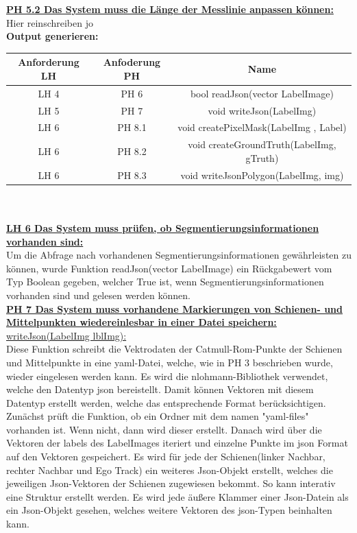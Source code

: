 \documentclass[11pt]{scrartcl}
\begin{document}
\noindent
\underline{\textbf {PH 5.2 Das System muss die Länge der Messlinie anpassen können:}}
\\

\noindent
Hier reinschreiben jo
\\

\noindent
\textbf{Output generieren:}
\\

\noindent
\begin{tabular}[h]{c|c|c}
Anforderung LH & Anfoderung PH & Name \\
\hline
 LH 4& PH 6 & bool readJson(vector LabelImage)\\
LH 5 & PH 7 & void writeJson(LabelImg)\\
LH 6 & PH 8.1 & void createPixelMask(LabelImg , Label)\\
LH 6 & PH 8.2 & void createGroundTruth(LabelImg, gTruth)\\
LH 6 & PH 8.3 & void writeJsonPolygon(LabelImg, img)\\
\end{tabular}
\\
\\

\noindent
\underline{\textbf {LH 6  Das System muss prüfen, ob Segmentierungsinformationen vorhanden sind:}}
\\

\noindent
Um die Abfrage nach vorhandenen Segmentierungsinformationen gewährleisten zu können, wurde Funktion readJson(vector LabelImage) ein Rückgabewert vom Typ Boolean gegeben, welcher True ist, wenn Segmentierungsinformationen vorhanden sind und gelesen werden können.
\\

\noindent
\underline{\textbf {PH 7 Das System muss vorhandene Markierungen von Schienen- und Mittelpunkten wiedereinlesbar in einer Datei speichern:}}
\\

\noindent
\underline{writeJson(LabelImg lblImg):}
\\

\noindent
Diese Funktion schreibt die Vektrodaten der Catmull-Rom-Punkte der Schienen und Mittelpunkte in eine yaml-Datei, welche, wie in PH 3 beschrieben wurde, wieder eingelesen werden kann. Es wird die nlohmann-Bibliothek verwendet, welche den Datentyp json bereistellt. Damit können Vektoren mit diesem Datentyp erstellt werden, welche das entsprechende Format berücksichtigen. Zunächst prüft die Funktion, ob ein Ordner mit dem namen "yaml-files" vorhanden ist. Wenn nicht, dann wird dieser erstellt. Danach wird über die Vektoren der labels des LabelImages iteriert und einzelne Punkte im json Format auf den Vektoren gespeichert.  Es wird für jede der Schienen(linker Nachbar, rechter Nachbar und Ego Track) ein weiteres Json-Objekt erstellt, welches die jeweiligen Json-Vektoren der Schienen zugewiesen bekommt. So kann interativ eine Struktur erstellt werden. Es wird jede äußere Klammer einer Json-Datein als ein Json-Objekt gesehen, welches weitere Vektoren des json-Typen beinhalten kann. 
\\
\end{document}
